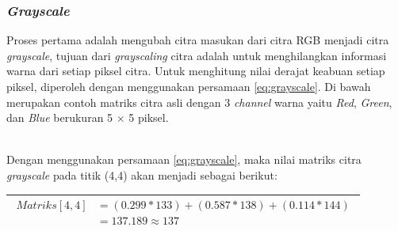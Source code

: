 \subsubsection{\textit{Grayscale}}
\noindent Proses pertama adalah mengubah citra masukan dari citra RGB menjadi citra \textit{grayscale}, tujuan dari \textit{grayscaling} citra adalah untuk menghilangkan informasi warna dari setiap piksel citra. Untuk menghitung nilai derajat keabuan setiap piksel, diperoleh dengan menggunakan persamaan \ref{eq:grayscale}.
\noindent Di bawah merupakan contoh matriks citra asli dengan 3 \textit{channel} warna yaitu \textit{Red}, \textit{Green}, dan \textit{Blue} berukuran 5 $\times$ 5 piksel. 
\\
\begin{adjustbox}{width=1\textwidth}
	\noindent\begin{minipage}{\linewidth}
		\label{fig:MatriksCitraAsal}
	\end{minipage}
\end{adjustbox} 
\\
\noindent Dengan menggunakan persamaan \ref{eq:grayscale}, maka nilai matriks citra \textit{grayscale} pada titik (4,4) akan menjadi sebagai berikut:
\begin{table}[H]
	\begin{adjustbox}{width=1\textwidth}
		\begin{tabular}{|p{13.55cm}|}
			\hline
			\begin{equation}\nonumber
			\begin{aligned}
			Matriks[4,4] &= (0.299 * 133) + (0.587 * 138) + (0.114 * 144) \\
						 &= 137.189 \approx 137 
			\end{aligned}
			\end{equation}\\
			\hline
		\end{tabular}
	\end{adjustbox}
\end{table}
